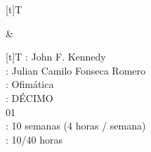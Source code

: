 \documentclass[letterpaper,10pt,spanish]{sphinxmanual}
\begin{document}
\begin{savenotes}\sphinxattablestart
\sphinxthistablewithglobalstyle
\centering
\begin{tabular}[t]{}
\sphinxtoprule
\sphinxtableatstartofbodyhook

\begin{savenotes}\sphinxattablestart
\sphinxthistablewithglobalstyle
\centering
\begin{tabulary}{\linewidth}[t]{T}
\sphinxtoprule
\sphinxtableatstartofbodyhook
\sphinxAtStartPar
{}
\\
\sphinxbottomrule
\end{tabulary}
\sphinxtableafterendhook\par
\sphinxattableend\end{savenotes}
&

\begin{savenotes}\sphinxattablestart
\sphinxthistablewithglobalstyle
\centering
\begin{tabulary}{\linewidth}[t]{T}
\sphinxtoprule
\sphinxtableatstartofbodyhook
\sphinxAtStartPar
{}: John F. Kennedy
\\
\sphinxhline
\sphinxAtStartPar
{}: Julian Camilo Fonseca Romero
\\
\sphinxhline
\sphinxAtStartPar
{}: Ofimática
\\
\sphinxhline
\sphinxAtStartPar
{}: DÉCIMO
\\
\sphinxhline
\sphinxAtStartPar
{} 01
\\
\sphinxhline
\sphinxAtStartPar
{}: 10 semanas (4 horas / semana)
\\
\sphinxhline
\sphinxAtStartPar
{}: 10/40 horas
\\
\sphinxbottomrule
\end{tabulary}
\sphinxtableafterendhook\par
\sphinxattableend\end{savenotes}
\\
\sphinxbottomrule
\end{tabular}
\sphinxtableafterendhook\par
\sphinxattableend\end{savenotes}
\end{document}
